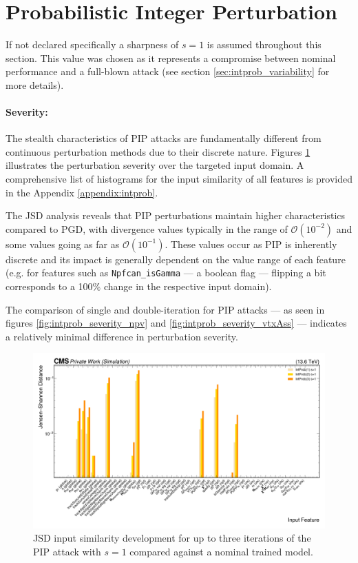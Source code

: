 \section{Probabilistic Integer Perturbation}
\label{sec:inprob_result}

If not declared specifically a sharpness of $s=1$ is assumed throughout this section. This value was chosen as it represents a compromise between nominal performance and a full-blown attack (see section \ref{sec:intprob_variability} for more details).

\paragraph{Severity:} The stealth characteristics of PIP attacks are fundamentally different from continuous perturbation methods due to their discrete nature. Figures \ref{fig:intprob_joint_overview} illustrates the perturbation severity over the targeted input domain. A comprehensive list of histograms for the input similarity of all features is provided in the Appendix \ref{appendix:intprob}.

The JSD analysis reveals that PIP perturbations maintain higher characteristics compared to PGD, with divergence values typically in the range of $\mathcal{O}(10^{-2})$ and some values going as far as $\mathcal{O}(10^{-1})$. These values occur as PIP is inherently discrete and its impact is generally dependent on the value range of each feature (e.g. for features such as \texttt{Npfcan\_isGamma} — a boolean flag — flipping a bit corresponds to a 100\% change in the respective input domain).

The comparison of single and double-iteration for PIP attacks — as seen in figures \ref{fig:intprob_severity_npv} and \ref{fig:intprob_severity_vtxAss} — indicates a relatively minimal difference in perturbation severity.

\begin{figure}[h]
\centering
    \includegraphics[width=15cm]{media/output/features/compare/jsd_intprob_per_feature.png}
    \caption{JSD input similarity development for up to three iterations of the PIP attack with $s=1$ compared against a nominal trained model.}
    \label{fig:intprob_joint_overview}
\end{figure}

